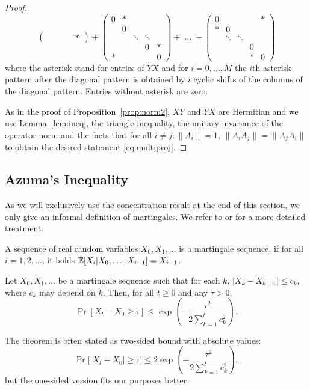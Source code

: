 \begin{proof}
\[\begin{pmatrix}
    &  &  & & * \end{pmatrix}
+ \begin{pmatrix} 0 & * &  &
     & \\   & 0 & &  &   \\   &  & \ddots & \ddots
    &  \\  &  & & 0 & * \\
    * &  &  & & 0 \end{pmatrix}
+\;\ldots\;
+ \begin{pmatrix} 0 & &  &
     & * \\  * & 0 & &  &   \\   &\ddots  & \! \ddots &  &  \\  
    &  & & 0 &  \\
    &  &  & * & 0 \end{pmatrix}
\]
where the asterisk stand for entries of $YX$ and for $i=0,\ldots,M$
the $i$th asterisk-pattern after the diagonal pattern is obtained by
$i$ cyclic shifts of the columns of the diagonal pattern. Entries
without asterisk are zero.

As in the proof of Proposition~\ref{prop:norm2}, $XY$ and
$YX$ are Hermitian and we use Lemma~\ref{lem:ineq}, the triangle
inequality, the unitary invariance of the operator norm and the facts
that for all $i \neq j : \|A_i\|=1$, $\|A_i A_j\|=\|A_j A_i\|$ to obtain the desired
statement \eqref{eq:multiproj}.
\end{proof}



\subsection{Azuma's Inequality}\label{sec:Azuma}
As we will exclusively use the concentration result at the end of this
section, we only give an informal definition of martingales. We refer
to \cite{AS00} or \cite{MR95} for a more detailed treatment.
\begin{definition}  
  A sequence of real random variables $X_0, X_1, \ldots$ is a
  martingale sequence, if for all $i=1,2,\ldots$, it holds $\mathbb{E}[X_i
  | X_0, \ldots, X_{i-1} ] = X_{i-1}$.
\end{definition}
\begin{theorem} \label{thm:azuma}
Let $X_0, X_1, \ldots$ be a martingale sequence such that for each
$k$, $|X_k - X_{k-1}| \leq c_k$, where $c_k$ may depend on $k$. Then,
for all $t \geq 0$ and any $\tau > 0$,
\[ \Pr[ X_t - X_0  \geq \tau ] \leq \exp \left(
  -\frac{\tau^2}{2 \sum_{k=1}^t c_k^2} \right) \, .
\]
\end{theorem}
The theorem is often stated as two-sided bound with absolute values:
\[ \Pr\big[ |X_t - X_0|  \geq \tau \big] \leq 2 \exp \left(
  -\frac{\tau^2}{2 \sum_{k=1}^t c_k^2} \right),
\]
but the one-sided version fits our purposes better.

